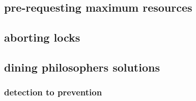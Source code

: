 \subsection{pre-requesting maximum resources}



\subsection{aborting locks}



\subsection{dining philosophers solutions}



\subsubsection{detection to prevention}

